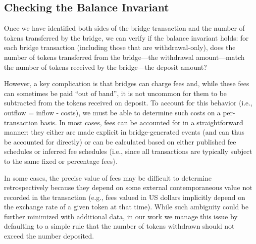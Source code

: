 \subsection{Checking the Balance Invariant}
Once we have identified both sides of the bridge transaction and the
number of tokens transferred by the bridge, we can verify if the
balance invariant holds: for each bridge transaction (including those
that are withdrawal-only), does the number of tokens transferred from
the bridge---the withdrawal amount---match the number of tokens
received by the bridge---the deposit amount?

However, a key complication is that bridges can charge fees and, while
these fees can sometimes be paid ``out of band'', it is not uncommon
for them to be subtracted from the tokens received on deposit.  To
account for this behavior (i.e., outflow = inflow - costs), we must be
able to determine such costs on a per-transaction basis.
In most cases, fees can be accounted for in a straightforward manner:
they either are made explicit in bridge-generated events (and can thus
be accounted for directly) or can be calculated based on either
published fee schedules or inferred fee schedules (i.e., since all
transactions are typically subject to the same fixed or percentage
fees).





In some cases, the precise value of fees may be difficult to determine
retrospectively because they depend on some external contemporaneous
value not recorded in the transaction (e.g., fees valued in US dollars
implicitly depend on the exchange rate of a given token at that time).
While such ambiguity could be further minimized with additional data,
in our work we manage this issue by defaulting to a simple rule
that the number of tokens withdrawn should not exceed the number
deposited.






